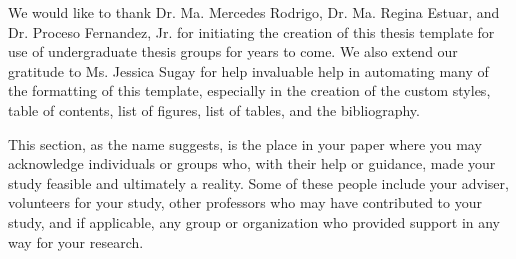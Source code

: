 \begin{acknowledgments}

    \noindent
    We would like to thank Dr. Ma. Mercedes Rodrigo, Dr. Ma. Regina Estuar, and Dr. Proceso Fernandez, Jr. for initiating the creation of this thesis template for use of undergraduate thesis groups for years to come. We also extend our gratitude to Ms. Jessica Sugay for help invaluable help in automating many of the formatting of this template, especially in the creation of the custom styles, table of contents, list of figures, list of tables, and the bibliography.

    This section, as the name suggests, is the place in your paper where you may acknowledge individuals or groups who, with their help or guidance, made your study feasible and ultimately a reality. Some of these people include your adviser, volunteers for your study, other professors who may have contributed to your study, and if applicable, any group or organization who provided support in any way for your research.

\end{acknowledgments}
